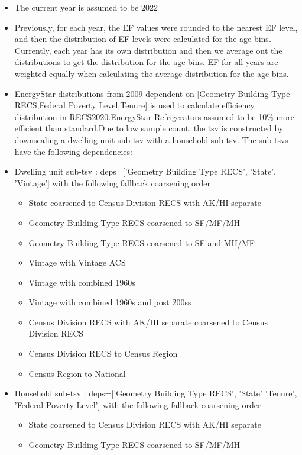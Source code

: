\begin{itemize}
\item The current year is assumed to be 2022
\item Previously, for each year, the EF values were rounded to the nearest EF level, and then the distribution of EF levels were calculated for the age bins. Currently, each year has its own distribution and then we average out the distributions to get the distribution for the age bins. EF for all years are weighted equally when calculating the average distribution for the age bins.
\item EnergyStar distributions from 2009 dependent on [Geometry Building Type RECS,Federal Poverty Level,Tenure] is used to calculate efficiency distribution in RECS2020.EnergyStar Refrigerators assumed to be 10\% more efficient than standard.Due to low sample count, the tsv is constructed by downscaling a dwelling unit sub-tsv with a household sub-tsv. The sub-tsvs have the following dependencies:
\item Dwelling unit sub-tsv : deps=['Geometry Building Type RECS', 'State', 'Vintage'] with the following fallback coarsening order
  \begin{itemize}
  \item [1] State coarsened to Census Division RECS with AK/HI separate
  \item [2] Geometry Building Type RECS coarsened to SF/MF/MH
  \item [3] Geometry Building Type RECS coarsened to SF and MH/MF
  \item [4] Vintage with Vintage ACS
  \item [5] Vintage with combined 1960s
  \item [6] Vintage with combined 1960s and post 200ss
  \item [7] Census Division RECS with AK/HI separate coarsened to Census Division RECS
  \item [8] Census Division RECS to Census Region
  \item [9] Census Region to National
  \end{itemize}
\item Household sub-tsv : deps=['Geometry Building Type RECS', 'State' 'Tenure', 'Federal Poverty Level'] with the following fallback coarsening order
  \begin{itemize}
  \item [1] State coarsened to Census Division RECS with AK/HI separate
  \item [2] Geometry Building Type RECS coarsened to SF/MF/MH

\end{itemize}
\end{itemize}
